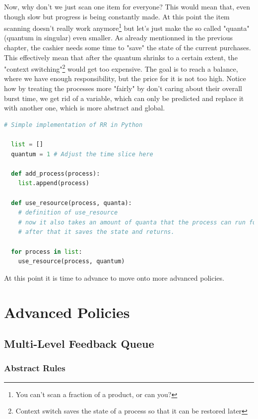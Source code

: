 \documentclass{report}
\newcounter{defi}[section]\setcounter{defi}{0}
\begin{document}
Now, why don't we just scan one item for everyone? 
This would mean that, even though slow but progress is being constantly made.
At this point the item scanning doesn't really work anymore\footnote{You can't scan a fraction of a product, or can you?} but let's just make the so called "quanta" (quantum in singular) even smaller.
As already mentionned in the previous chapter, the cashier needs some time to "save" the state of the current purchases. 
This effectively mean that after the quantum shrinks to a certain extent, the "context switching"\footnote{Context switch saves the state of a process so that it can be restored later} would get too expensive. 
The goal is to reach a balance, where we have enough responsibility, but the price for it is not too high.
Notice how by treating the processes more "fairly" by don't caring about their overall burst time, we get rid of a variable, which can only be predicted and replace it with another one, which is more abstract and global.
\pagebreak
\begin{lstlisting}[language=Python, style=colorEX, label=cd:rr-python]
  # Simple implementation of RR in Python

  list = []
  quantum = 1 # Adjust the time slice here

  def add_process(process):
    list.append(process)

  def use_resource(process, quanta):
    # definition of use_resource
    # now it also takes an amount of quanta that the process can run for
    # after that it saves the state and returns.

  for process in list:
    use_resource(process, quantum)

\end{lstlisting}

At this point it is time to advance to move onto more advanced policies.

\part{Advanced Policies}


\chapter{Multi-Level Feedback Queue}

\section{Abstract Rules}
\end{document}
